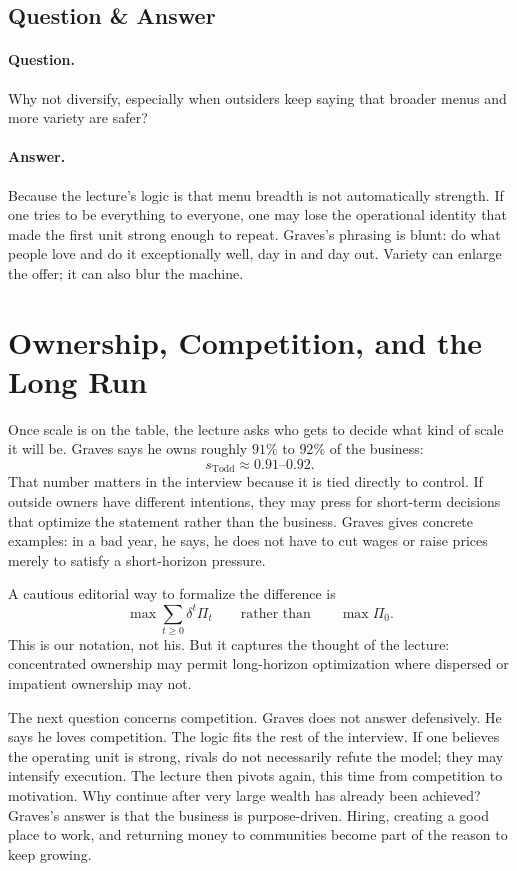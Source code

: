 \subsection{Question \& Answer}

\paragraph{Question.}
Why not diversify, especially when outsiders keep saying that broader menus and more variety are safer?

\paragraph{Answer.}
Because the lecture's logic is that menu breadth is not automatically strength. If one tries to be everything to everyone, one may lose the operational identity that made the first unit strong enough to repeat. Graves's phrasing is blunt: do what people love and do it exceptionally well, day in and day out. Variety can enlarge the offer; it can also blur the machine.

\section{Ownership, Competition, and the Long Run}

Once scale is on the table, the lecture asks who gets to decide what kind of scale it will be. Graves says he owns roughly \(91\%\) to \(92\%\) of the business:
\begin{equation}
s_{\mathrm{Todd}} \approx 0.91\text{--}0.92.
\end{equation}
That number matters in the interview because it is tied directly to control. If outside owners have different intentions, they may press for short-term decisions that optimize the statement rather than the business. Graves gives concrete examples: in a bad year, he says, he does not have to cut wages or raise prices merely to satisfy a short-horizon pressure.

A cautious editorial way to formalize the difference is
\begin{equation}
\max \sum_{t\ge 0}\delta^t \Pi_t
\qquad \text{rather than} \qquad
\max \Pi_0.
\end{equation}
This is our notation, not his. But it captures the thought of the lecture: concentrated ownership may permit long-horizon optimization where dispersed or impatient ownership may not.

The next question concerns competition. Graves does not answer defensively. He says he loves competition. The logic fits the rest of the interview. If one believes the operating unit is strong, rivals do not necessarily refute the model; they may intensify execution. The lecture then pivots again, this time from competition to motivation. Why continue after very large wealth has already been achieved? Graves's answer is that the business is purpose-driven. Hiring, creating a good place to work, and returning money to communities become part of the reason to keep growing.

